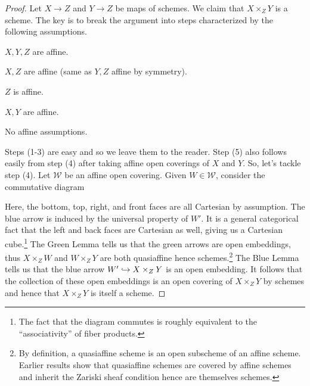 \documentclass[11pt]{article}
\newcommand{\W}{\mathscr{W}}
\begin{document}
\begin{proof}
Let $X\to Z$ and $Y\to Z$ be maps of schemes. We claim that $X\times_ZY$ is a scheme. The key is to break the argument into steps characterized by the following assumptions.
\begin{enum}{\arabic}
\item $X,Y,Z$ are affine.

\item $X,Z$ are affine (same as $Y,Z$ affine by symmetry).

\item $Z$ is affine.

\item $X,Y$ are affine.

\item No affine assumptions.
\end{enum}
Steps \textup{(1-3)} are easy and so we leave them to the reader. Step \textup{(5)} also follows easily from step \textup{(4)} after taking affine open coverings of $X$ and $Y$. So, let's tackle step \textup{(4)}. Let $\W$ be an affine open covering. Given $W\in\W$, consider the commutative diagram
\begin{center}
\end{center}
Here, the bottom, top, right, and front faces are all Cartesian by assumption. The blue arrow is induced by the universal property of $W'$. It is a general categorical fact that the left and back faces are Cartesian as well, giving us a Cartesian cube.\footnote{The fact that the diagram commutes is roughly equivalent to the ``associativity'' of fiber products.} The Green Lemma tells us that the green arrows are open embeddings, thus $X\times_ZW$ and $W\times_ZY$ are both quasiaffine hence schemes.\footnote{By definition, a quasiaffine scheme is an open subscheme of an affine scheme. Earlier results show that quasiaffine schemes are covered by affine schemes and inherit the Zariski sheaf condition hence are themselves schemes.} The Blue Lemma tells us that the blue arrow $W'\hookrightarrow X\times_ZY$ is an open embedding. It follows that the collection of these open embeddings is an open covering of $X\times_ZY$ by schemes and hence that $X\times_ZY$ is itself a scheme.
\end{proof}
\end{document}
